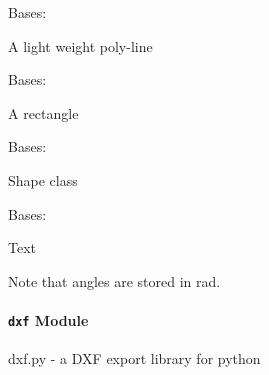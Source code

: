 \documentclass[letterpaper,10pt,english]{sphinxmanual}
\begin{document}

\begin{fulllineitems}
\label{api/gtrace.draw:gtrace.draw.draw.PolyLine}
Bases: {\hyperref[api/gtrace.draw:gtrace.draw.draw.Shape]{}}

A light weight poly-line

\end{fulllineitems}


\begin{fulllineitems}
\label{api/gtrace.draw:gtrace.draw.draw.Rectangle}
Bases: {\hyperref[api/gtrace.draw:gtrace.draw.draw.Shape]{}}

A rectangle

\end{fulllineitems}


\begin{fulllineitems}
\label{api/gtrace.draw:gtrace.draw.draw.Shape}
Bases: 

Shape class

\end{fulllineitems}


\begin{fulllineitems}
\label{api/gtrace.draw:gtrace.draw.draw.Text}
Bases: {\hyperref[api/gtrace.draw:gtrace.draw.draw.Shape]{}}

Text

Note that angles are stored in rad.

\end{fulllineitems}



\paragraph{\texttt{dxf} Module}
\label{api/gtrace.draw:dxf-module}\label{api/gtrace.draw:module-gtrace.draw.dxf}
dxf.py - a DXF export library for python
\end{document}

